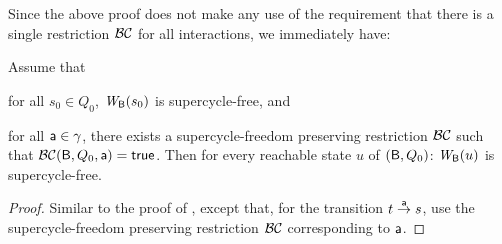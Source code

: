 Since the above proof does not make any use of the requirement that there is a single restriction
$\mathcal{BC}$ for all interactions, we immediately have:


\begin{corollary}

\label{cor:SC-free-preserving.deadlock-free}
Assume that
\bn
\item \label{cor:SC-free-preserving.initial}
      for all $s_0 \in Q_0$, $\mathit{W}_{\mathsf{B}}({s_0})$ is supercycle-free, and
\item \label{cor:SC-free-preserving.reachable-transitions}
   for all $\mathsf{a} \in \gamma$, there exists a supercycle-freedom preserving restriction $\mathcal{BC}$ such that $\mathcal{BC}(\mathsf{B}, Q_0, \mathsf{a}) = \mathsf{true}$.
\en
Then for every reachable state $u$ of $(\mathsf{B}, Q_0)$:  $\mathit{W}_{\mathsf{B}}({u})$ is supercycle-free.
\end{corollary}
%
\begin{proof}
Similar to the proof of ,  except that, for
the transition $t \stackrel{\mathsf{a}}{\rightarrow} s$, use the  supercycle-freedom preserving restriction $\mathcal{BC}$
corresponding to $\mathsf{a}$.
\end{proof}










